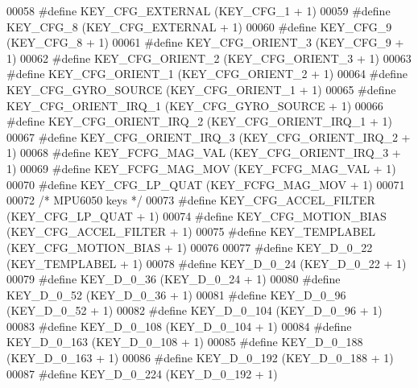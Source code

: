 \begin{DoxyCode}
00058 \textcolor{preprocessor}{#define KEY\_CFG\_EXTERNAL            (KEY\_CFG\_1 + 1)}
00059 \textcolor{preprocessor}{#define KEY\_CFG\_8                   (KEY\_CFG\_EXTERNAL + 1)}
00060 \textcolor{preprocessor}{#define KEY\_CFG\_9                   (KEY\_CFG\_8 + 1)}
00061 \textcolor{preprocessor}{#define KEY\_CFG\_ORIENT\_3            (KEY\_CFG\_9 + 1)}
00062 \textcolor{preprocessor}{#define KEY\_CFG\_ORIENT\_2            (KEY\_CFG\_ORIENT\_3 + 1)}
00063 \textcolor{preprocessor}{#define KEY\_CFG\_ORIENT\_1            (KEY\_CFG\_ORIENT\_2 + 1)}
00064 \textcolor{preprocessor}{#define KEY\_CFG\_GYRO\_SOURCE         (KEY\_CFG\_ORIENT\_1 + 1)}
00065 \textcolor{preprocessor}{#define KEY\_CFG\_ORIENT\_IRQ\_1        (KEY\_CFG\_GYRO\_SOURCE + 1)}
00066 \textcolor{preprocessor}{#define KEY\_CFG\_ORIENT\_IRQ\_2        (KEY\_CFG\_ORIENT\_IRQ\_1 + 1)}
00067 \textcolor{preprocessor}{#define KEY\_CFG\_ORIENT\_IRQ\_3        (KEY\_CFG\_ORIENT\_IRQ\_2 + 1)}
00068 \textcolor{preprocessor}{#define KEY\_FCFG\_MAG\_VAL            (KEY\_CFG\_ORIENT\_IRQ\_3 + 1)}
00069 \textcolor{preprocessor}{#define KEY\_FCFG\_MAG\_MOV            (KEY\_FCFG\_MAG\_VAL + 1)}
00070 \textcolor{preprocessor}{#define KEY\_CFG\_LP\_QUAT             (KEY\_FCFG\_MAG\_MOV + 1)}
00071 
00072 \textcolor{comment}{/* MPU6050 keys */}
00073 \textcolor{preprocessor}{#define KEY\_CFG\_ACCEL\_FILTER        (KEY\_CFG\_LP\_QUAT + 1)}
00074 \textcolor{preprocessor}{#define KEY\_CFG\_MOTION\_BIAS         (KEY\_CFG\_ACCEL\_FILTER + 1)}
00075 \textcolor{preprocessor}{#define KEY\_TEMPLABEL               (KEY\_CFG\_MOTION\_BIAS + 1)}
00076 
00077 \textcolor{preprocessor}{#define KEY\_D\_0\_22                  (KEY\_TEMPLABEL + 1)}
00078 \textcolor{preprocessor}{#define KEY\_D\_0\_24                  (KEY\_D\_0\_22 + 1)}
00079 \textcolor{preprocessor}{#define KEY\_D\_0\_36                  (KEY\_D\_0\_24 + 1)}
00080 \textcolor{preprocessor}{#define KEY\_D\_0\_52                  (KEY\_D\_0\_36 + 1)}
00081 \textcolor{preprocessor}{#define KEY\_D\_0\_96                  (KEY\_D\_0\_52 + 1)}
00082 \textcolor{preprocessor}{#define KEY\_D\_0\_104                 (KEY\_D\_0\_96 + 1)}
00083 \textcolor{preprocessor}{#define KEY\_D\_0\_108                 (KEY\_D\_0\_104 + 1)}
00084 \textcolor{preprocessor}{#define KEY\_D\_0\_163                 (KEY\_D\_0\_108 + 1)}
00085 \textcolor{preprocessor}{#define KEY\_D\_0\_188                 (KEY\_D\_0\_163 + 1)}
00086 \textcolor{preprocessor}{#define KEY\_D\_0\_192                 (KEY\_D\_0\_188 + 1)}
00087 \textcolor{preprocessor}{#define KEY\_D\_0\_224                 (KEY\_D\_0\_192 + 1)}

\end{DoxyCode}
